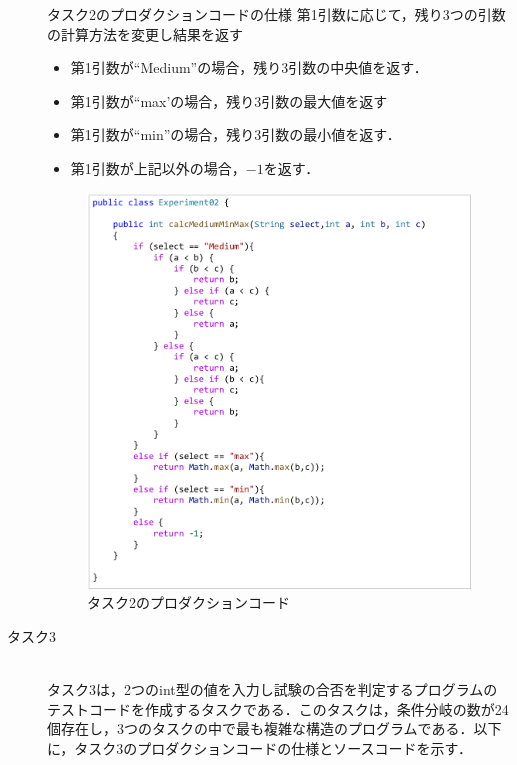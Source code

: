 \documentclass[12pt]{jarticle} %
\begin{document}
\begin{description}
\begin{itembox}[l]{タスク2のプロダクションコードの仕様}
第1引数に応じて，残り3つの引数の計算方法を変更し結果を返す
\begin{itemize}
\item 第1引数が``Medium''の場合，残り3引数の中央値を返す．
\item 第1引数が``max'の場合，残り3引数の最大値を返す
\item 第1引数が``min''の場合，残り3引数の最小値を返す．
\item 第1引数が上記以外の場合，$-1$を返す．
\end{itemize}
\end{itembox}

\begin{figure}[htbp]
  \begin{center}
    \includegraphics[clip,width=13cm]{E2.pdf}
    \caption{タスク2のプロダクションコード}
    \label{E2}
  \end{center}
\end{figure}


\item[タスク3]~\\
タスク3は，2つのint型の値を入力し試験の合否を判定するプログラムのテストコードを作成するタスクである．このタスクは，条件分岐の数が24個存在し，3つのタスクの中で最も複雑な構造のプログラムである．以下に，タスク3のプロダクションコードの仕様とソースコードを示す．


\end{description}
\end{document}
